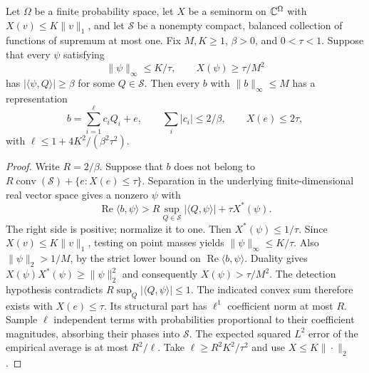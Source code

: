 \begin{lemma}\label{shift:modeling}
Let $\Omega$ be a finite probability space, let $X$ be a seminorm
on $\mathbb C^\Omega$ with $X(v)\leq K\|v\|_1$, and let
$\mathcal S$ be a nonempty compact, balanced collection of functions of
supremum at most one.  Fix $M,K\geq1$, $\beta>0$, and $0<\tau<1$.
Suppose that every $\psi$ satisfying
\[
 \|\psi\|_\infty\leq K/\tau,
 \qquad X(\psi)\geq\tau/M^2
\]
has $|\langle\psi,Q\rangle|\geq\beta$ for some $Q\in\mathcal S$.
Then every $b$ with $\|b\|_\infty\leq M$ has a representation
\[
 b=\sum_{i=1}^{\ell}c_iQ_i+e,\qquad
 \sum_i|c_i|\leq2/\beta,
 \qquad X(e)\leq2\tau,
\]
with $\ell\leq1+4K^2/(\beta^2\tau^2)$.
\end{lemma}
\begin{proof}
Write $R=2/\beta$.  Suppose that $b$ does not belong to
$R\operatorname{conv}(\mathcal S)+\{e:X(e)\leq\tau\}$.
Separation in the underlying finite-dimensional real vector space
gives a nonzero $\psi$ with
\[
 \operatorname{Re}\langle b,\psi\rangle>
 R\sup_{Q\in\mathcal S}|\langle Q,\psi\rangle|
 +\tau X^*(\psi).
\]
The right side is positive; normalize it to one.
Then $X^*(\psi)\leq1/\tau$.  Since
$X(v)\leq K\|v\|_1$, testing on point masses yields
$\|\psi\|_\infty\leq K/\tau$.
Also $\|\psi\|_2>1/M$, by the strict lower bound on
$\operatorname{Re}\langle b,\psi\rangle$.
Duality gives
$X(\psi)X^*(\psi)\geq\|\psi\|_2^2$ and consequently
$X(\psi)>\tau/M^2$.
The detection hypothesis contradicts
$R\sup_Q|\langle Q,\psi\rangle|\leq1$.
The indicated convex sum therefore exists with $X(e)\leq\tau$.
Its structural part has $\ell^1$ coefficient norm at most $R$.
Sample $\ell$ independent terms with probabilities proportional
to their coefficient magnitudes, absorbing their phases into
$\mathcal S$.  The expected squared $L^2$ error of the empirical
average is at most $R^2/\ell$.  Take
$\ell\geq R^2K^2/\tau^2$ and use $X\leq K\|\cdot\|_2$.
\end{proof}

